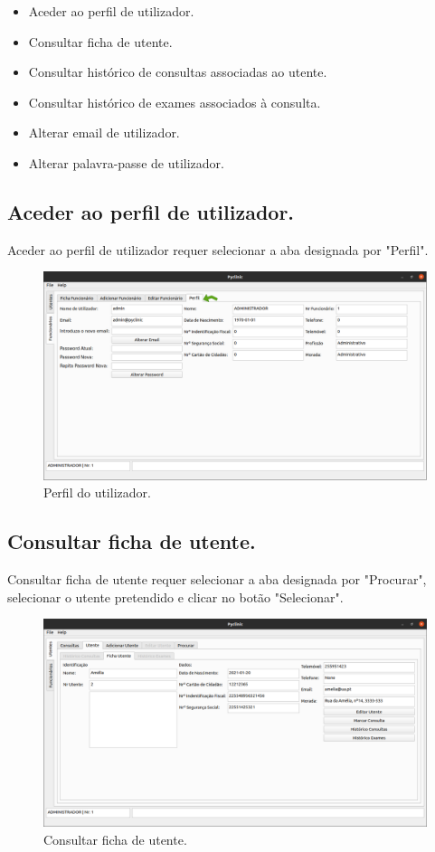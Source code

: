 \documentclass[11pt,a4paper,twoside]{article}
\begin{document}
\begin{itemize}
	\item Aceder ao perfil de utilizador.
	\item Consultar ficha de utente.
	\item Consultar histórico de consultas associadas ao utente.
	\item Consultar histórico de exames associados à consulta.
	
	\item Alterar email de utilizador.
	\item Alterar palavra-passe de utilizador.
\end{itemize}

\subsection{Aceder ao perfil de utilizador.}
Aceder ao perfil de utilizador requer selecionar a aba designada por "Perfil".

\begin{figure}[H]
	\centering
	\includegraphics[width=0.9\linewidth]{image/admin/perfil.png}
	\caption{Perfil do utilizador.}
	\label{fig:perfilutilizador}
\end{figure}

\subsection{Consultar ficha de utente.}
Consultar ficha de utente requer selecionar a aba designada por "Procurar", selecionar o utente pretendido e clicar no botão "Selecionar".

\begin{figure}[H]
	\centering
	\includegraphics[width=0.9\linewidth]{image/admin/fichaUtente.png}
	\caption{Consultar ficha de utente.}
	\label{fig:fichautente}
\end{figure}
\end{document}
